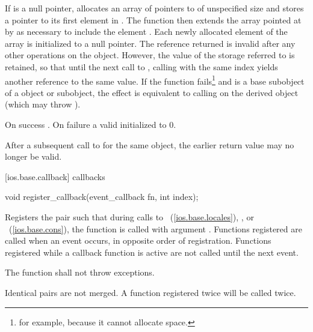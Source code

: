 \begin{itemdescr}
\pnum
\effects
If  is a null pointer, allocates an array of
pointers to  of unspecified size and stores a pointer to
its
first element in .
The function then extends the array
pointed at by  as necessary to include the element
.
Each newly allocated element of the array is initialized to a null
pointer.
The reference returned is invalid after any other operations on the
object.
However, the value of the storage referred to is retained, so
that until the next call to
,
calling
with the same index yields another reference to the same value.
If the function fails\footnote{for example, because it cannot allocate space.}
and
is a base subobject of a
object or subobject, the effect is equivalent to calling
on the derived object (which may throw
).

\pnum
\returns
On success
.
On failure a valid
initialized to 0.

\pnum
\notes
After a subsequent call to
for the same object, the earlier return value may no longer be valid.
\end{itemdescr}

[ios.base.callback]{ callbacks}

%
\begin{itemdecl}
void register_callback(event_callback fn, int index);
\end{itemdecl}

\begin{itemdescr}
\pnum
\effects
Registers the pair
such that during calls to
~(\ref{ios.base.locales}),
,
or
~(\ref{ios.base.cons}),
the function
is called with argument
.
Functions registered are called when an event occurs, in opposite order of
registration.
Functions registered while a callback function is active are not called until the next event.

\pnum
\requires
The function
shall not throw exceptions.

\notes
Identical pairs are not merged.
A function registered twice will be called twice.
\end{itemdescr}

